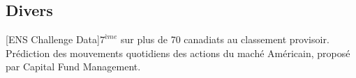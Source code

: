 \documentclass[a4paper]{arthur-cv-fr}
\begin{document}
\begin{textblock}{20.5}
\begin{minipage}[t]{0.61\textwidth}
    \section{Divers}
      \begin{rightenv}
        [ENS Challenge Data]{$7^{ème}$ sur plus de 70 canadiats au classement provisoir. Prédiction des mouvements quotidiens des actions du maché Américain, proposé par Capital Fund Management.}
      \end{rightenv}

  \end{minipage}

\end{textblock}
\end{document}
